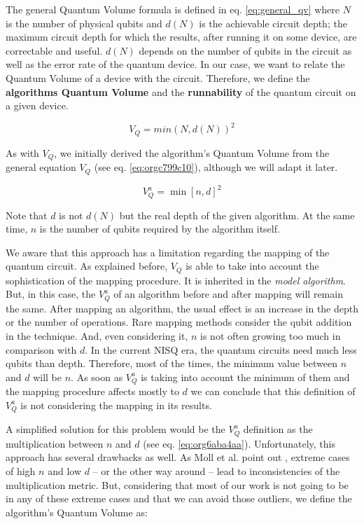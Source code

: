 The general Quantum Volume formula is defined in eq. \ref{eq:general_qv} where \(N\) is the number of physical qubits and \(d(N)\) is the achievable circuit depth; the maximum circuit depth for which the results, after running it on some device, are correctable and useful.
\(d(N)\) depends on the number of qubits in the circuit as well as the error rate of the quantum device.
In our case, we want to relate the Quantum Volume of a device with the circuit.
Therefore, we define the \textbf{algorithms Quantum Volume} and the \textbf{runnability} of the quantum circuit on a given device.

\begin{equation}
\label{eq:general_qv}
V_Q = min (N, d(N))^2
\end{equation}

As with \(V_Q\), we initially derived the algorithm's Quantum Volume from the general equation \(V_Q\) (see eq. \ref{eq:orgc799c10}), although we will adapt it later.

\begin{equation}
\label{eq:orgc799c10}
V_Q^a = \min \left[ n,d \right]^2
\end{equation}

Note that \(d\) is not \(d(N)\) but the real depth of the given algorithm.
At the same time, \(n\) is the number of qubits required by the algorithm itself.

We aware that this approach has a limitation regarding the mapping of the quantum circuit.
As explained before, \(V_Q\) is able to take into account the sophistication of the mapping procedure.
It is inherited in the \emph{model algorithm}.
But, in this case, the \(V^a_Q\) of an algorithm before and after mapping will remain the same.
After mapping an algorithm, the usual effect is an increase in the depth or the number of operations.
Rare mapping methods consider the qubit addition in the technique.
And, even considering it, \(n\) is not often growing too much in comparison with \(d\).
In the current NISQ era, the quantum circuits need much less qubits than depth.
Therefore, most of the times, the minimum value between \(n\) and \(d\) will be \(n\).
As soon as \(V^a_Q\) is taking into account the minimum of them and the mapping procedure affects mostly to \(d\) we can conclude that this definition of \(V^a_Q\) is not considering the mapping in its results.

A simplified solution for this problem would be the \(V^a_Q\) definition as the multiplication between \(n\) and \(d\) (see eq. \ref{eq:org6aba4aa}).
Unfortunately, this approach has several drawbacks as well.
As Moll et al. point out \cite{Moll_2018}, extreme cases of high \(n\) and low \(d\) -- or the other way around -- lead to inconsistencies of the multiplication metric.
But, considering that most of our work is not going to be in any of these extreme cases and that we can avoid those outliers, we define the algorithm's Quantum Volume as:


